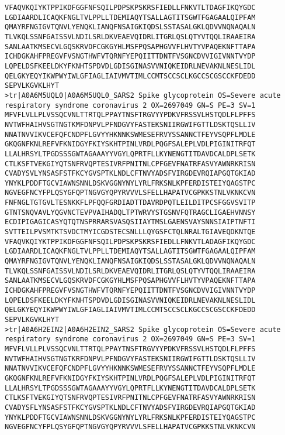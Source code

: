 \begin{lstlisting}
VFAQVKQIYKTPPIKDFGGFNFSQILPDPSKPSKRSFIEDLLFNKVTLTDAGFIKQYGDC
LGDIAARDLICAQKFNGLTVLPPLLTDEMIAQYTSALLAGTITSGWTFGAGAALQIPFAM
QMAYRFNGIGVTQNVLYENQKLIANQFNSAIGKIQDSLSSTASALGKLQDVVNQNAQALN
TLVKQLSSNFGAISSVLNDILSRLDKVEAEVQIDRLITGRLQSLQTYVTQQLIRAAEIRA
SANLAATKMSECVLGQSKRVDFCGKGYHLMSFPQSAPHGVVFLHVTYVPAQEKNFTTAPA
ICHDGKAHFPREGVFVSNGTHWFVTQRNFYEPQIITTDNTFVSGNCDVVIGIVNNTVYDP
LQPELDSFKEELDKYFKNHTSPDVDLGDISGINASVVNIQKEIDRLNEVAKNLNESLIDL
QELGKYEQYIKWPWYIWLGFIAGLIAIVMVTIMLCCMTSCCSCLKGCCSCGSCCKFDEDD
SEPVLKGVKLHYT
>tr|A0A6M5UQL0|A0A6M5UQL0_SARS2 Spike glycoprotein OS=Severe acute respiratory syndrome coronavirus 2 OX=2697049 GN=S PE=3 SV=1
MFVFLVLLPLVSSQCVNLTTRTQLPPAYTNSFTRGVYYPDKVFRSSVLHSTQDLFLPFFS
NVTWFHAIHVSGTNGTKMFDNPVLPFNDGVYFASTEKSNIIRGWIFGTTLDSKTQSLLIV
NNATNVVIKVCEFQFCNDPFLGVYYHKNNKSWMESEFRVYSSANNCTFEYVSQPFLMDLE
GKQGNFKNLREFVFKNIDGYFKIYSKHTPINLVRDLPQGFSALEPLVDLPIGINITRFQT
LLALHRSYLTPGDSSSGWTAGAAAYYVGYLQPRTFLLKYNENGTITDAVDCALDPLSETK
CTLKSFTVEKGIYQTSNFRVQPTESIVRFPNITNLCPFGEVFNATRFASVYAWNRKRISN
CVADYSVLYNSASFSTFKCYGVSPTKLNDLCFTNVYADSFVIRGDEVRQIAPGQTGKIAD
YNYKLPDDFTGCVIAWNSNNLDSKVGGNYNYLYRLFRKSNLKPFERDISTEIYQAGSTPC
NGVEGFNCYFPLQSYGFQPTNGVGYQPYRVVVLSFELLHAPATVCGPKKSTNLVKNKCVN
FNFNGLTGTGVLTESNKKFLPFQQFGRDIADTTDAVRDPQTLEILDITPCSFGGVSVITP
GTNTSNQVAVLYQGVNCTEVPVAIHADQLTPTWRVYSTGSNVFQTRAGCLIGAEHVNNSY
ECDIPIGAGICASYQTQTNSPRRARSVASQSIIAYTMSLGAENSVAYSNNSIAIPTNFTI
SVTTEILPVSMTKTSVDCTMYICGDSTECSNLLLQYGSFCTQLNRALTGIAVEQDKNTQE
VFAQVKQIYKTPPIKDFGGFNFSQILPDPSKPSKRSFIEDLLFNKVTLADAGFIKQYGDC
LGDIAARDLICAQKFNGLTVLPPLLTDEMIAQYTSALLAGTITSGWTFGAGAALQIPFAM
QMAYRFNGIGVTQNVLYENQKLIANQFNSAIGKIQDSLSSTASALGKLQDVVNQNAQALN
TLVKQLSSNFGAISSVLNDILSRLDKVEAEVQIDRLITGRLQSLQTYVTQQLIRAAEIRA
SANLAATKMSECVLGQSKRVDFCGKGYHLMSFPQSAPHGVVFLHVTYVPAQEKNFTTAPA
ICHDGKAHFPREGVFVSNGTHWFVTQRNFYEPQIITTDNTFVSGNCDVVIGIVNNTVYDP
LQPELDSFKEELDKYFKNHTSPDVDLGDISGINASVVNIQKEIDRLNEVAKNLNESLIDL
QELGKYEQYIKWPWYIWLGFIAGLIAIVMVTIMLCCMTSCCSCLKGCCSCGSCCKFDEDD
SEPVLKGVKLHYT
>tr|A0A6H2EIN2|A0A6H2EIN2_SARS2 Spike glycoprotein OS=Severe acute respiratory syndrome coronavirus 2 OX=2697049 GN=S PE=3 SV=1
MFVFLVLLPLVSSQCVNLTTRTQLPPAYTNSFTRGVYYPDKVFRSSVLHSTQDLFLPFFS
NVTWFHAIHVSGTNGTKRFDNPVLPFNDGVYFASTEKSNIIRGWIFGTTLDSKTQSLLIV
NNATNVVIKVCEFQFCNDPFLGVYYHKNNKSWMESEFRVYSSANNCTFEYVSQPFLMDLE
GKQGNFKNLREFVFKNIDGYFKIYSKHTPINLVRDLPQGFSALEPLVDLPIGINITRFQT
LLALHRSYLTPGDSSSGWTAGAAAYYVGYLQPRTFLLKYNENGTITDAVDCALDPLSETK
CTLKSFTVEKGIYQTSNFRVQPTESIVRFPNITNLCPFGEVFNATRFASVYAWNRKRISN
CVADYSFLYNSASFSTFKCYGVSPTKLNDLCFTNVYADSFVIRGDEVRQIAPGQTGKIAD
YNYKLPDDFTGCVIAWNSNNLDSKVGGNYNYLYRLFRKSNLKPFERDISTEIYQAGSTPC
NGVEGFNCYFPLQSYGFQPTNGVGYQPYRVVVLSFELLHAPATVCGPKKSTNLVKNKCVN

\end{lstlisting}
